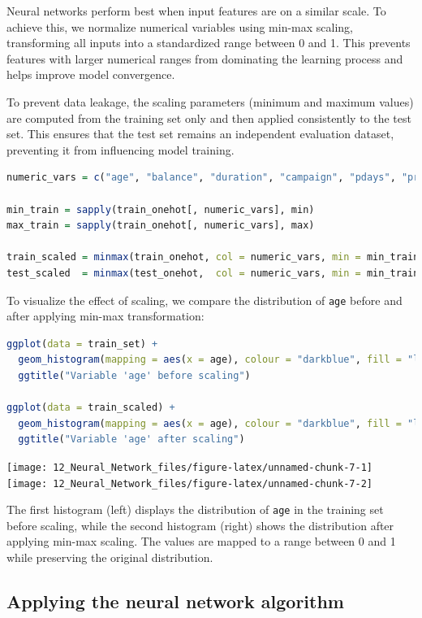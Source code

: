 \documentclass[
  11pt,
]{book}
\newcommand{\passthrough}[1]{#1}
\theoremstyle{definition}
\theoremstyle{definition}
\theoremstyle{definition}
\theoremstyle{definition}
\theoremstyle{remark}
\begin{document}
Neural networks perform best when input features are on a similar scale. To achieve this, we normalize numerical variables using min-max scaling, transforming all inputs into a standardized range between 0 and 1. This prevents features with larger numerical ranges from dominating the learning process and helps improve model convergence.

To prevent data leakage, the scaling parameters (minimum and maximum values) are computed from the training set only and then applied consistently to the test set. This ensures that the test set remains an independent evaluation dataset, preventing it from influencing model training.

\begin{lstlisting}[language=R]
numeric_vars = c("age", "balance", "duration", "campaign", "pdays", "previous")

min_train = sapply(train_onehot[, numeric_vars], min)
max_train = sapply(train_onehot[, numeric_vars], max)

train_scaled = minmax(train_onehot, col = numeric_vars, min = min_train, max = max_train)
test_scaled  = minmax(test_onehot,  col = numeric_vars, min = min_train, max = max_train)
\end{lstlisting}

To visualize the effect of scaling, we compare the distribution of \passthrough{\lstinline!age!} before and after applying min-max transformation:

\begin{lstlisting}[language=R]
ggplot(data = train_set) +
  geom_histogram(mapping = aes(x = age), colour = "darkblue", fill = "lightblue") +
  ggtitle("Variable 'age' before scaling")

ggplot(data = train_scaled) +
  geom_histogram(mapping = aes(x = age), colour = "darkblue", fill = "lightblue") +
  ggtitle("Variable 'age' after scaling")
\end{lstlisting}

\texttt{[image: 12\_Neural\_Network\_files/figure-latex/unnamed-chunk-7-1]} \texttt{[image: 12\_Neural\_Network\_files/figure-latex/unnamed-chunk-7-2]}

The first histogram (left) displays the distribution of \passthrough{\lstinline!age!} in the training set before scaling, while the second histogram (right) shows the distribution after applying min-max scaling. The values are mapped to a range between 0 and 1 while preserving the original distribution.

\subsection*{Applying the neural network algorithm}\label{applying-the-neural-network-algorithm}
\end{document}
